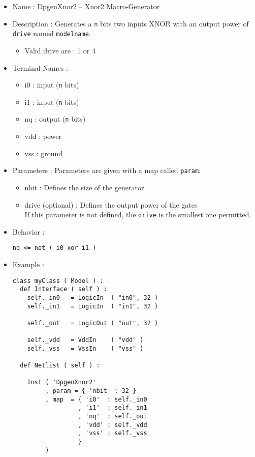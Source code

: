\begin{itemize}
    \item Name : DpgenXnor2 -- Xnor2 Macro-Generator
    \item Description : Generates a \verb-n- bits two inputs XNOR with an output power of \verb-drive- named \verb-modelname-.
    \begin{itemize}
        \item Valid drive are : 1 or 4
    \end{itemize}
    \item Terminal Names :
    \begin{itemize}
        \item i0 : input (\verb-n- bits)
        \item i1 : input (\verb-n- bits)
        \item nq : output (\verb-n- bits)
        \item vdd : power
        \item vss : ground
    \end{itemize}
    \item Parameters : Parameters are given with a map called \verb-param-.
    \begin{itemize}
        \item nbit : Defines the size of the generator
        \item drive (optional) : Defines the output power of the gates\\If this parameter is not defined, the \verb-drive- is the smallest one permitted.
    \end{itemize}
    \item Behavior :
\begin{verbatim}
nq <= not ( i0 xor i1 )
\end{verbatim}
    \item Example :
\begin{verbatim}
class myClass ( Model ) :
  def Interface ( self ) :
    self._in0   = LogicIn  ( "in0", 32 )
    self._in1   = LogicIn  ( "in1", 32 )
    
    self._out   = LogicOut ( "out", 32 )

    self._vdd   = VddIn    ( "vdd" )
    self._vss   = VssIn    ( "vss" )
    
  def Netlist ( self ) :
      
    Inst ( 'DpgenXnor2'
         , param = { 'nbit' : 32 }
         , map  = { 'i0'  : self._in0
                  , 'i1'  : self._in1
                  , 'nq'  : self._out
                  , 'vdd' : self._vdd
                  , 'vss' : self._vss
                  }
         )
\end{verbatim}
\end{itemize}
